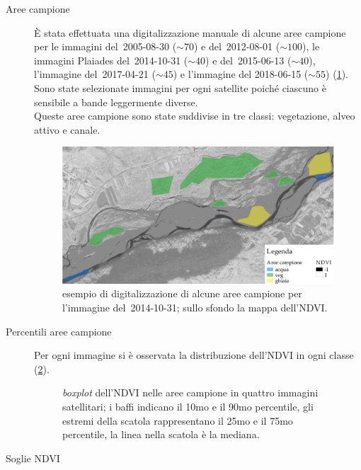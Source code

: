 \begin{description}
\begin{equation}
		\label{eq:ndvi}
	\end{equation}
	\item[Aree campione]
	\`{E} stata effettuata una digitalizzazione manuale di alcune aree campione per le immagini \AST{} del~2005-08-30 ($\sim 70$) e del~2012-08-01 ($\sim 100$), le immagini Plaiades del~2014-10-31 ($\sim 40$) e del~2015-06-13 ($\sim 40$), l'immagine \Se{} del~2017-04-21 ($\sim 45$) e l'immagine \WV{} del 2018-06-15 ($\sim 55$) (\cref{fig:esempio-aree-campione}).
	Sono state selezionate immagini per ogni satellite poiché ciascuno è sensibile a bande leggermente diverse. 
	\\
	Queste aree campione sono state suddivise in tre classi: vegetazione, alveo attivo e canale.
	\begin{figure}[ht]
		\centering
		\includegraphics[width=\textwidth]{files/esempio_aree_campione_2014_10_31.jpeg}
		\caption[esempio di aree campione per calcolare la distribuzione dell'NDVI]{esempio di digitalizzazione di alcune aree campione per l'immagine \Pl{} del~2014-10-31; sullo sfondo la mappa dell'NDVI.}
		\label{fig:esempio-aree-campione}
	\end{figure}
	\item[Percentili aree campione]
	Per ogni immagine si è osservata la distribuzione dell'NDVI in ogni classe (\cref{graph:percentili}).
	\begin{figure}[ht]
		\centering
		
		\caption[\emph{boxplot} dell'NDVI nelle aree campione in quattro immagini satellitari]{\emph{boxplot} dell'NDVI nelle aree campione in quattro immagini satellitari; i baffi indicano il 10mo e il 90mo percentile, gli estremi della scatola rappresentano il 25mo e il 75mo percentile, la linea nella scatola è la mediana.}
		\label{graph:percentili}
	\end{figure}
	\item[Soglie NDVI] 

\end{description}
